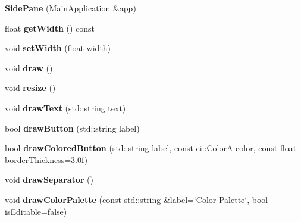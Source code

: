 \begin{DoxyCompactItemize}
\item 
\mbox{\label{classpepr3d_1_1_side_pane_ac34e40627f74677c9acd8048fb6527e7}} 
{\bfseries Side\+Pane} (\mbox{\hyperlink{classpepr3d_1_1_main_application}{Main\+Application}} \&app)
\item 
\mbox{\label{classpepr3d_1_1_side_pane_a0d9965d55d1b631ec97a98698bbcd67b}} 
float {\bfseries get\+Width} () const
\item 
\mbox{\label{classpepr3d_1_1_side_pane_a4418b3cd4e7c4e584d91f826d1e944b9}} 
void {\bfseries set\+Width} (float width)
\item 
\mbox{\label{classpepr3d_1_1_side_pane_a1ff5531d18ef9a1ad2149e59661c8d77}} 
void {\bfseries draw} ()
\item 
\mbox{\label{classpepr3d_1_1_side_pane_a41774f95d968169688441c34a7b0e21b}} 
void {\bfseries resize} ()
\item 
\mbox{\label{classpepr3d_1_1_side_pane_ad52b2636cb54b25ed796ad8bae54a535}} 
void {\bfseries draw\+Text} (std\+::string text)
\item 
\mbox{\label{classpepr3d_1_1_side_pane_a28107c4c4448600ef6f07b5c22928b22}} 
bool {\bfseries draw\+Button} (std\+::string label)
\item 
\mbox{\label{classpepr3d_1_1_side_pane_a6fcb108b3358ec5b16e08359440d2e83}} 
bool {\bfseries draw\+Colored\+Button} (std\+::string label, const ci\+::\+ColorA color, const float border\+Thickness=3.\+0f)
\item 
\mbox{\label{classpepr3d_1_1_side_pane_ac9c2d073fb25be1145899accd17813fa}} 
void {\bfseries draw\+Separator} ()
\item 
\mbox{\label{classpepr3d_1_1_side_pane_a33641b0bade39edf124bc6c23a6271a0}} 
void {\bfseries draw\+Color\+Palette} (const std\+::string \&label=\char`\"{}Color Palette\char`\"{}, bool is\+Editable=false)

\end{DoxyCompactItemize}
